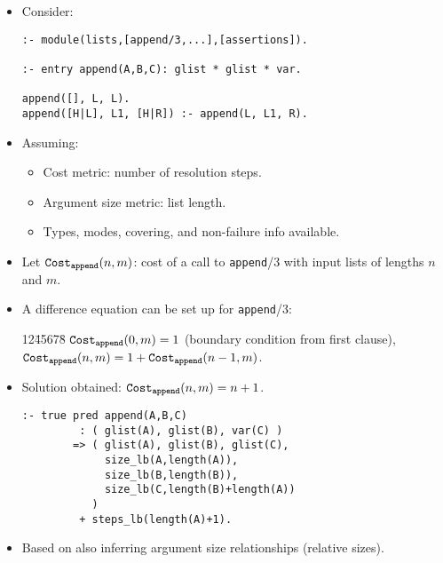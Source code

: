 \documentclass{article}
\renewcommand{\_}{\char'137}
\begin{document}
\begin{itemize}

\item Consider:
\begin{verbatim}
:- module(lists,[append/3,...],[assertions]).

:- entry append(A,B,C): glist * glist * var.

append([], L, L).
append([H|L], L1, [H|R]) :- append(L, L1, R).
\end{verbatim}

\item Assuming:
\begin{itemize}
\item Cost metric: number of resolution steps.
\item Argument size metric: list length. 
\item Types, modes, covering, and non-failure info available.
\end{itemize}

\item Let 
  ${\tt Cost_{append}}(n, m)$: cost of a call to {\tt append}/3 with
  input lists of lengths $n$ and $m$. 

\item A difference equation can be set up for {\tt append}/3:
 \begin{tabbing}
 12\=45678\=\kill
 \> ${\tt Cost_{append}}(0, m) = 1$ (boundary condition from first clause),\\
 \> ${\tt Cost_{append}}(n, m) = 1 + {\tt Cost_{append}}(n-1, m)$.
 \end{tabbing}

\item Solution obtained: ${\tt Cost_{append}}(n, m) = n+1$.

\begin{verbatim}
:- true pred append(A,B,C)
         : ( glist(A), glist(B), var(C) )
        => ( glist(A), glist(B), glist(C), 
             size_lb(A,length(A)), 
             size_lb(B,length(B)),
             size_lb(C,length(B)+length(A))
           )
         + steps_lb(length(A)+1).
\end{verbatim}

\item Based on also inferring argument size relationships (relative sizes).
\end{itemize}


\end{document}
